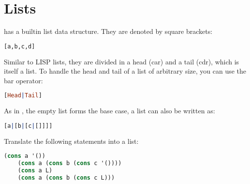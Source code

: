 \documentclass{../../../tp}
\begin{document}
\section{Lists}

\prolog has a builtin list data structure. They are denoted by square brackets:

\begin{lstlisting}[language=prolog]
[a,b,c,d]
\end{lstlisting}

Similar to LISP lists, they are divided in a head (car) and a tail (cdr), which is itself a list. To handle the head and tail of a list of arbitrary size, you can use the bar operator:

\begin{lstlisting}[language=prolog]
[Head|Tail]
\end{lstlisting}

As in \scheme, the empty list \prologcode{[]} forms the base case, a list \prologcode{[a,b,c]} can also be written as:

\begin{lstlisting}[language=prolog]
[a|[b|[c|[]]]]
\end{lstlisting}



\begin{instruction}
Translate the following \scheme statements into a \prolog list:

\begin{lstlisting}[language=lisp]
	(cons a '())
	(cons a (cons b (cons c '())))
	(cons a L)
	(cons a (cons b (cons c L)))
\end{lstlisting}
	
\end{instruction}
\end{document}
